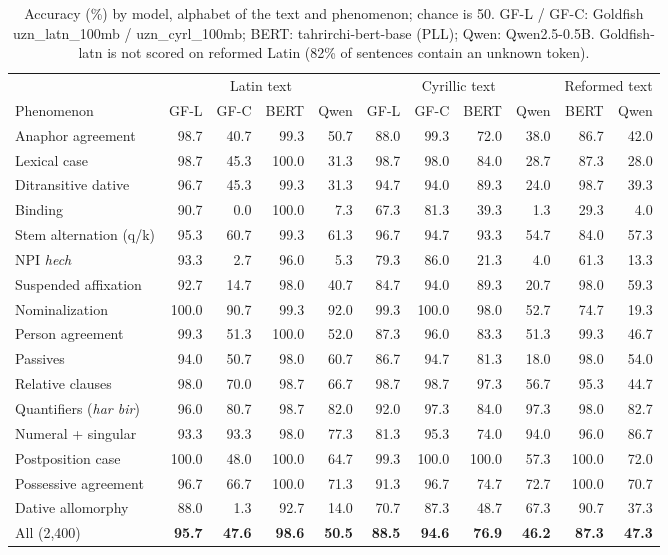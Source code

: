 \begin{table}[t]
\centering\small
\begin{tabular}{lrrrrrrrrrr}
\toprule
 & \multicolumn{4}{c}{Latin text} & \multicolumn{4}{c}{Cyrillic text} & \multicolumn{2}{c}{Reformed text} \\
\cmidrule(lr){2-5} \cmidrule(lr){6-9} \cmidrule(lr){10-11}
Phenomenon & GF-L & GF-C & BERT & Qwen & GF-L & GF-C & BERT & Qwen & BERT & Qwen \\
\midrule
Anaphor agreement & 98.7 & 40.7 & 99.3 & 50.7 & 88.0 & 99.3 & 72.0 & 38.0 & 86.7 & 42.0 \\
Lexical case & 98.7 & 45.3 & 100.0 & 31.3 & 98.7 & 98.0 & 84.0 & 28.7 & 87.3 & 28.0 \\
Ditransitive dative & 96.7 & 45.3 & 99.3 & 31.3 & 94.7 & 94.0 & 89.3 & 24.0 & 98.7 & 39.3 \\
Binding & 90.7 & 0.0 & 100.0 & 7.3 & 67.3 & 81.3 & 39.3 & 1.3 & 29.3 & 4.0 \\
Stem alternation (q/k) & 95.3 & 60.7 & 99.3 & 61.3 & 96.7 & 94.7 & 93.3 & 54.7 & 84.0 & 57.3 \\
NPI \textit{hech} & 93.3 & 2.7 & 96.0 & 5.3 & 79.3 & 86.0 & 21.3 & 4.0 & 61.3 & 13.3 \\
Suspended affixation & 92.7 & 14.7 & 98.0 & 40.7 & 84.7 & 94.0 & 89.3 & 20.7 & 98.0 & 59.3 \\
Nominalization & 100.0 & 90.7 & 99.3 & 92.0 & 99.3 & 100.0 & 98.0 & 52.7 & 74.7 & 19.3 \\
Person agreement & 99.3 & 51.3 & 100.0 & 52.0 & 87.3 & 96.0 & 83.3 & 51.3 & 99.3 & 46.7 \\
Passives & 94.0 & 50.7 & 98.0 & 60.7 & 86.7 & 94.7 & 81.3 & 18.0 & 98.0 & 54.0 \\
Relative clauses & 98.0 & 70.0 & 98.7 & 66.7 & 98.7 & 98.7 & 97.3 & 56.7 & 95.3 & 44.7 \\
Quantifiers (\textit{har bir}) & 96.0 & 80.7 & 98.7 & 82.0 & 92.0 & 97.3 & 84.0 & 97.3 & 98.0 & 82.7 \\
Numeral + singular & 93.3 & 93.3 & 98.0 & 77.3 & 81.3 & 95.3 & 74.0 & 94.0 & 96.0 & 86.7 \\
Postposition case & 100.0 & 48.0 & 100.0 & 64.7 & 99.3 & 100.0 & 100.0 & 57.3 & 100.0 & 72.0 \\
Possessive agreement & 96.7 & 66.7 & 100.0 & 71.3 & 91.3 & 96.7 & 74.7 & 72.7 & 100.0 & 70.7 \\
Dative allomorphy & 88.0 & 1.3 & 92.7 & 14.0 & 70.7 & 87.3 & 48.7 & 67.3 & 90.7 & 37.3 \\
\midrule
All (2,400) & \textbf{95.7} & \textbf{47.6} & \textbf{98.6} & \textbf{50.5} & \textbf{88.5} & \textbf{94.6} & \textbf{76.9} & \textbf{46.2} & \textbf{87.3} & \textbf{47.3} \\
\bottomrule
\end{tabular}
\caption{Accuracy (\%) by model, alphabet of the text and phenomenon; chance is 50. GF-L / GF-C: Goldfish uzn\_latn\_100mb / uzn\_cyrl\_100mb; BERT: tahrirchi-bert-base (PLL); Qwen: Qwen2.5-0.5B. Goldfish-latn is not scored on reformed Latin (82\% of sentences contain an unknown token).}
\label{tab:accuracy}
\end{table}
